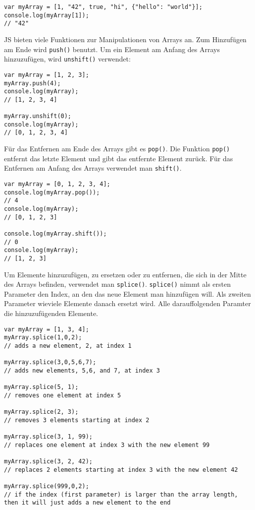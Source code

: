 \documentclass{book}
\begin{document}
\begin{lstlisting}[caption=Array Konstruktor]
var myArray = [1, "42", true, "hi", {"hello": "world"}];
console.log(myArray[1]);
// "42"
\end{lstlisting}

JS bieten viele Funktionen zur Manipulationen von Arrays an.
Zum Hinzufügen am Ende wird \lstinline|push()| benutzt. Um ein Element am Anfang des Arrays hinzuzufügen, wird \lstinline|unshift()| verwendet:

\begin{lstlisting}[caption=Array Konstruktor]
var myArray = [1, 2, 3];
myArray.push(4);
console.log(myArray); 
// [1, 2, 3, 4]

myArray.unshift(0);
console.log(myArray); 
// [0, 1, 2, 3, 4]
\end{lstlisting}

Für das Entfernen am Ende des Arrays gibt es \lstinline|pop()|. Die Funktion \lstinline|pop()| entfernt das letzte Element und gibt das entfernte Element zurück. Für das Entfernen am Anfang des Arrays verwendet man \lstinline|shift()|. 

\begin{lstlisting}[caption=Array Konstruktor]
var myArray = [0, 1, 2, 3, 4];
console.log(myArray.pop());
// 4
console.log(myArray); 
// [0, 1, 2, 3]

console.log(myArray.shift());
// 0
console.log(myArray); 
// [1, 2, 3]
\end{lstlisting}

Um Elemente hinzuzufügen, zu ersetzen oder zu entfernen, die sich in der Mitte des Arrays befinden, verwendet man \lstinline|splice()|. \lstinline|splice()| nimmt als ersten Parameter den Index, an den das neue Element man hinzufügen will. Als zweiten Parameter wieviele Elemente danach ersetzt wird. Alle darauffolgenden Paramter die hinzuzufügenden Elemente.

\begin{lstlisting}[caption=Array Konstruktor]
var myArray = [1, 3, 4];
myArray.splice(1,0,2); 
// adds a new element, 2, at index 1

myArray.splice(3,0,5,6,7); 
// adds new elements, 5,6, and 7, at index 3

myArray.splice(5, 1); 
// removes one element at index 5

myArray.splice(2, 3); 
// removes 3 elements starting at index 2

myArray.splice(3, 1, 99); 
// replaces one element at index 3 with the new element 99

myArray.splice(3, 2, 42); 
// replaces 2 elements starting at index 3 with the new element 42

myArray.splice(999,0,2); 
// if the index (first parameter) is larger than the array length, then it will just adds a new element to the end
\end{lstlisting}
\end{document}
